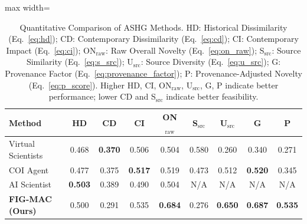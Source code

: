 \documentclass[runningheads]{llncs}
\begin{document}
\begin{table}[t]
\centering
\small
\setlength{\tabcolsep}{2pt}
\begin{adjustbox}{max width=\textwidth}
\begin{tabular}{lcccccccc}
\toprule
\textbf{Method} & \textbf{HD} & \textbf{CD} & \textbf{CI} & \textbf{ON$_{\text{raw}}$} & \textbf{S$_{\text{src}}$} & \textbf{U$_{\text{src}}$} & \textbf{G} & \textbf{P} \\
\midrule
Virtual Scientists & 0.468 & \textbf{0.370} & 0.506 & 0.504 & 0.580 & 0.260 & 0.340 & 0.271 \\
COI Agent & 0.477 & 0.375 & \textbf{0.517} & 0.519 & 0.473 & 0.512 & \textbf{0.520} & 0.345 \\
AI Scientist & \textbf{0.503} & 0.389 & 0.490 & 0.504 & N/A & N/A & N/A & N/A \\
\midrule
\textbf{FIG-MAC (Ours)} & 0.500 & 0.291 & 0.535 & \textbf{0.684} & 0.276 & \textbf{0.650} & \textbf{0.687} & \textbf{0.535} \\
\bottomrule
\end{tabular}
\end{adjustbox}
\caption{Quantitative Comparison of ASHG Methods. HD: Historical Dissimilarity (Eq.~\ref{eq:hd}); CD: Contemporary Dissimilarity (Eq.~\ref{eq:cd}); CI: Contemporary Impact (Eq.~\ref{eq:ci}); ON$_{\text{raw}}$: Raw Overall Novelty (Eq.~\ref{eq:on_raw}); S$_{\text{src}}$: Source Similarity (Eq.~\ref{eq:s_src}); U$_{\text{src}}$: Source Diversity (Eq.~\ref{eq:u_src}); G: Provenance Factor (Eq.~\ref{eq:provenance_factor}); P: Provenance-Adjusted Novelty (Eq.~\ref{eq:p_score}). Higher HD, CI, ON$_{\text{raw}}$, U$_{\text{src}}$, G, P indicate better performance; lower CD and S$_{\text{src}}$ indicate better feasibility.}
\label{tab:main_results}
\end{table}
\end{document}
